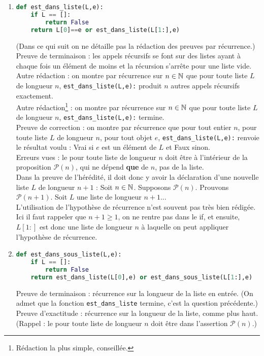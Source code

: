 \documentclass[11pt,a4paper]{article}
\begin{document}
\begin{enumerate}
\item 
\begin{lstlisting}[language=Python]
def est_dans_liste(L,e):
	if L == []:
		return False
	return L[0]==e or est_dans_liste(L[1:],e)
\end{lstlisting}
(Dans ce qui suit on ne détaille pas la rédaction des preuves par récurrence.)\\

Preuve de terminaison : les appels récursifs se font sur des listes ayant à chaque fois un élément de moins et la récursion s'arrête pour une liste vide.\\
Autre rédaction : on montre par récurrence sur $n\in\mathbb{N}$ que pour toute liste $L$ de longueur $n$, \verb+est_dans_liste(L,e):+ produit $n$ autres appels récursifs exactement.\\
Autre rédaction\footnote{Rédaction la plus simple, conseillée.} : on montre par récurrence sur $n\in\mathbb{N}$ que pour toute liste $L$ de longueur $n$, \verb+est_dans_liste(L,e):+ termine.\\
Preuve de correction : on montre par récurrence que pour tout entier $n$, pour toute liste $L$ de longueur $n$, pour tout objet $e$, \verb+est_dans_liste(L,e):+ renvoie le résultat voulu : Vrai si $e$ est un élément de $L$ et Faux sinon.\\

Erreurs vues : le \og pour toute liste de longueur $n$\fg{} doit être à l'intérieur de la proposition $\mathcal P(n)$, qui ne dépend \textbf{que} de $n$, pas de la liste.\\
Dans la preuve de l'hérédité, il doit donc y avoir la déclaration d'une nouvelle liste $L$ de longueur $n+1$ : \og Soit $n\in \mathbb{N}$. Supposons $\mathcal P(n)$. Prouvons $\mathcal P(n+1)$. Soit $L$ une liste de longueur $n+1$...\fg\\
L'utilisation de l'hypothèse de récurrence n'est souvent pas très bien rédigée. Ici il faut rappeler que $n+1 \geq 1$, on ne rentre pas dans le \og if\fg, et ensuite,  $L[1:]$ est donc une liste de longueur $n$ à laquelle on peut appliquer l'hypothèse de récurrence.
\item 
\begin{lstlisting}[language=Python]
def est_dans_sous_liste(L,e):
	if L == []:
		return False
	return est_dans_liste(L[0],e) or est_dans_sous_liste(L[1:],e)
\end{lstlisting}
Preuve de terminaison : récurrence sur la longueur de la liste en entrée. (On admet que la fonction \verb+est_dans_liste+ termine, c'est la question précédente.)\\
Preuve d'exactitude : récurrence sur la longueur de la liste, comme plus haut. (Rappel : le \og pour toute liste de longueur $n$\fg{} doit être dans l'assertion $\mathcal P(n)$.)
\end{enumerate}
\end{document}
